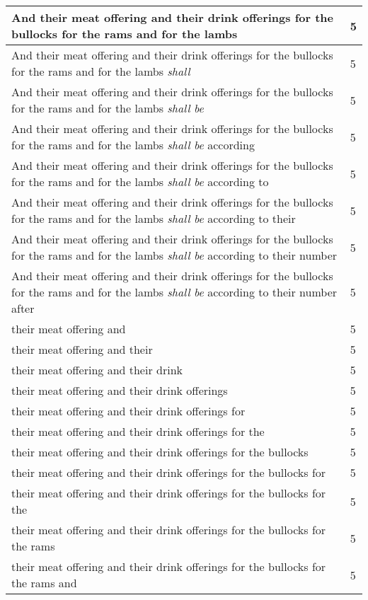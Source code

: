 \begin{center}
\begin{longtable}{|p{3.0in}|p{0.5in}|}
And their meat offering and their drink offerings for the bullocks for the rams and for the lambs & 5\\ \hline 
And their meat offering and their drink offerings for the bullocks for the rams and for the lambs \emph{shall} & 5\\ \hline 
And their meat offering and their drink offerings for the bullocks for the rams and for the lambs \emph{shall} \emph{be} & 5\\ \hline 
And their meat offering and their drink offerings for the bullocks for the rams and for the lambs \emph{shall} \emph{be} according & 5\\ \hline 
And their meat offering and their drink offerings for the bullocks for the rams and for the lambs \emph{shall} \emph{be} according to & 5\\ \hline 
And their meat offering and their drink offerings for the bullocks for the rams and for the lambs \emph{shall} \emph{be} according to their & 5\\ \hline 
And their meat offering and their drink offerings for the bullocks for the rams and for the lambs \emph{shall} \emph{be} according to their number & 5\\ \hline 
And their meat offering and their drink offerings for the bullocks for the rams and for the lambs \emph{shall} \emph{be} according to their number after & 5\\ \hline 
their meat offering and & 5\\ \hline 
their meat offering and their & 5\\ \hline 
their meat offering and their drink & 5\\ \hline 
their meat offering and their drink offerings & 5\\ \hline 
their meat offering and their drink offerings for & 5\\ \hline 
their meat offering and their drink offerings for the & 5\\ \hline 
their meat offering and their drink offerings for the bullocks & 5\\ \hline 
their meat offering and their drink offerings for the bullocks for & 5\\ \hline 
their meat offering and their drink offerings for the bullocks for the & 5\\ \hline 
their meat offering and their drink offerings for the bullocks for the rams & 5\\ \hline 
their meat offering and their drink offerings for the bullocks for the rams and & 5\\ \hline 

\end{longtable}
\end{center}
